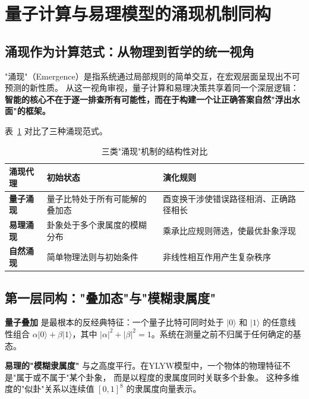 \documentclass[twocolumn]{article}
\begin{document}
\section{量子计算与易理模型的涌现机制同构}

\subsection{涌现作为计算范式：从物理到哲学的统一视角}

"涌现"（Emergence）是指系统通过局部规则的简单交互，在宏观层面呈现出不可预测的新性质\cite{anderson1972}。
从这一视角审视，量子计算和易理决策共享着同一个深层逻辑：
\textbf{智能的核心不在于逐一排查所有可能性，而在于构建一个让正确答案自然"浮出水面"的框架。}

表~\ref{tab:emergence} 对比了三种涌现范式。

\begin{table}[htbp]
\centering
\caption{三类"涌现"机制的结构性对比}
\label{tab:emergence}
\begin{tabular}{p{2.5cm}p{4cm}p{4cm}}
\toprule
\textbf{涌现代理} & \textbf{初始状态} & \textbf{演化规则} \\
\midrule
\textbf{量子涌现} & 量子比特处于所有可能解的叠加态 & 酉变换干涉使错误路径相消、正确路径相长 \\
\textbf{易理涌现} & 卦象处于多个隶属度的模糊分布 & 乘承比应规则筛选，使最优卦象浮现 \\
\textbf{自然涌现} & 简单物理法则与初始条件 & 非线性相互作用产生复杂秩序 \\
\bottomrule
\end{tabular}
\end{table}

\subsection{第一层同构："叠加态"与"模糊隶属度"}

\textbf{量子叠加} 是最根本的反经典特征：一个量子比特可同时处于 $|0\rangle$ 和 $|1\rangle$ 的任意线性组合
$\alpha|0\rangle + \beta|1\rangle$，其中 $|\alpha|^2 + |\beta|^2 = 1$。系统在测量之前不归属于任何确定的基态。

\textbf{易理的"模糊隶属度"} 与之高度平行。在YLYW模型中，一个物体的物理特征不是"属于或不属于"某个卦象，
而是以程度的隶属度同时关联多个卦象。
这种多维度的"似卦"关系以连续值 $[0, 1]^8$ 的隶属度向量表示\cite{ylyw2026}。
\end{document}
